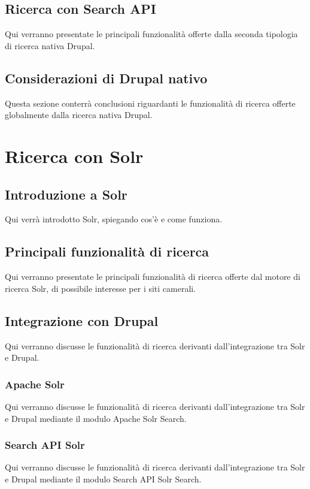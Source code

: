 		\subsection{Ricerca con Search API}
		Qui verranno presentate le principali funzionalità offerte dalla seconda tipologia di ricerca nativa Drupal.
		
		\subsection{Considerazioni di Drupal nativo}
		Questa sezione conterrà conclusioni riguardanti le funzionalità di ricerca offerte globalmente dalla ricerca nativa Drupal.

	\section{Ricerca con Solr}

		\subsection{Introduzione a Solr}
		Qui verrà introdotto Solr, spiegando cos'è e come funziona.
		
		\subsection{Principali funzionalità di ricerca}
		Qui verranno presentate le principali funzionalità di ricerca offerte dal motore di ricerca Solr, di possibile interesse per i siti camerali.
			
		\subsection{Integrazione con Drupal}
		Qui verranno discusse le funzionalità di ricerca derivanti dall'integrazione tra Solr e Drupal.
			
			\subsubsection{Apache Solr}
			Qui verranno discusse le funzionalità di ricerca derivanti dall'integrazione tra Solr e Drupal mediante il modulo Apache Solr Search.
			
			\subsubsection{Search API Solr}
			Qui verranno discusse le funzionalità di ricerca derivanti dall'integrazione tra Solr e Drupal mediante il modulo Search API Solr Search.
	
